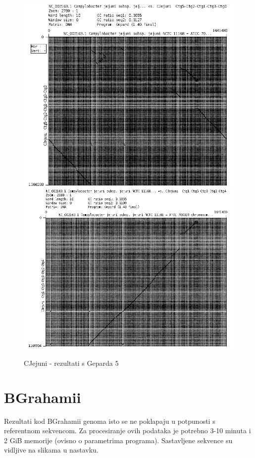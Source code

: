 \begin{figure}[H]
    \centering
    \includegraphics[scale=0.5]{img/Grah9.png}    \includegraphics[scale=0.5]{img/Grah6.png}
    \caption{CJejuni - rezultati s Geparda 5}
    \label{fig:cjejuni5}
\end{figure}

\section{BGrahamii}
Rezultati kod BGrahamii genoma isto se ne poklapaju u potpunosti s referentnom sekvencom. Za procesiranje ovih podataka je potrebno 3-10 minuta i 2 GiB memorije (ovisno o parametrima programa). Sastavljene sekvence su vidljive na slikama u nastavku.


